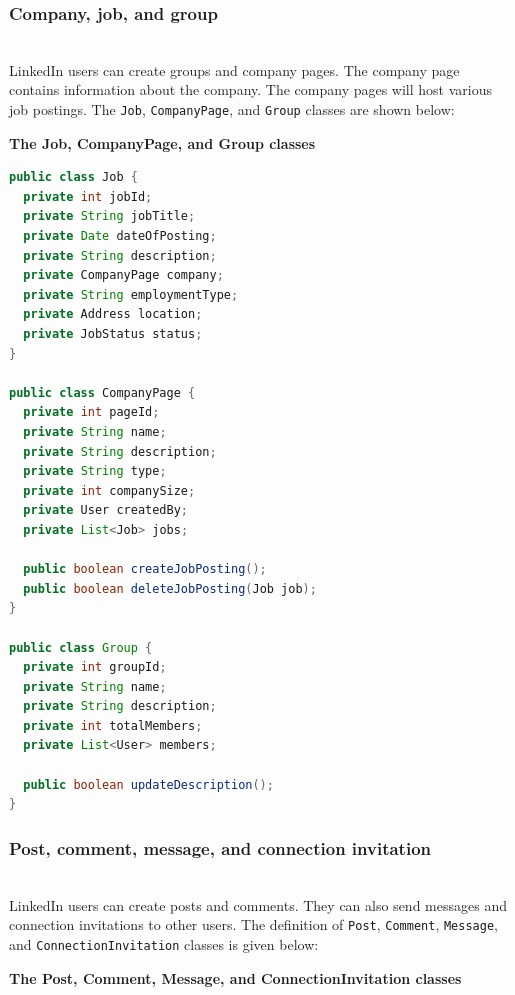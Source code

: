 \subsubsection{Company, job, and group}\label{VRwvdmI5hHTkK2vx5I9yn}
\\
LinkedIn users can create groups and company pages. The company page contains information about the company. The company pages will host various job postings. The
\texttt{Job}, \texttt{CompanyPage}, and \texttt{Group} classes are shown below:

\textbf{The Job, CompanyPage, and Group classes}

\begin{lstlisting}[language=Java]
public class Job {
  private int jobId;
  private String jobTitle;
  private Date dateOfPosting;
  private String description;
  private CompanyPage company;
  private String employmentType;
  private Address location;
  private JobStatus status;
}

public class CompanyPage {
  private int pageId;
  private String name;
  private String description;
  private String type;
  private int companySize;
  private User createdBy;
  private List<Job> jobs;

  public boolean createJobPosting();
  public boolean deleteJobPosting(Job job);
}

public class Group {
  private int groupId;
  private String name;
  private String description;
  private int totalMembers;
  private List<User> members;

  public boolean updateDescription();
}
\end{lstlisting}

\subsubsection{Post, comment, message, and connection invitation}\label{dlqUBwjKZaL-y2_tZ0owV}
\\
LinkedIn users can create posts and comments. They can also send messages and connection invitations to other users. The definition of \texttt{Post}, \texttt{Comment}, \texttt{Message}, and \texttt{ConnectionInvitation} classes is given below:

\textbf{The Post, Comment, Message, and ConnectionInvitation classes}

